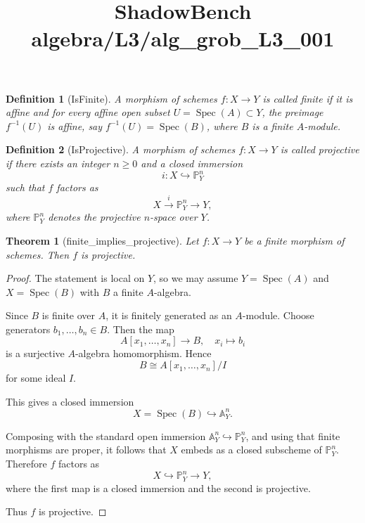 \documentclass{article}
\title{ShadowBench algebra/L3/alg\_grob\_L3\_001}
\newtheorem{theorem}{Theorem}
\newtheorem{definition}{Definition}
\begin{document}
\maketitle

\begin{definition}[IsFinite]
A morphism of schemes $f : X \to Y$ is called \emph{finite} if it is affine and for every affine open subset 
$U = \operatorname{Spec}(A) \subset Y$, the preimage $f^{-1}(U)$ is affine, say $f^{-1}(U) = \operatorname{Spec}(B)$, 
where $B$ is a finite $A$-module.
\end{definition}

\begin{definition}[IsProjective]
A morphism of schemes $f : X \to Y$ is called \emph{projective} if there exists an integer $n \ge 0$ and a closed immersion
\[
i : X \hookrightarrow \mathbb{P}^n_Y
\]
such that $f$ factors as
\[
X \xrightarrow{i} \mathbb{P}^n_Y \to Y,
\]
where $\mathbb{P}^n_Y$ denotes the projective $n$-space over $Y$.
\end{definition}

\begin{theorem}[finite_implies_projective]
Let $f : X \to Y$ be a finite morphism of schemes. Then $f$ is projective.
\end{theorem}
\begin{proof}
The statement is local on $Y$, so we may assume $Y = \operatorname{Spec}(A)$ 
and $X = \operatorname{Spec}(B)$ with $B$ a finite $A$-algebra.

Since $B$ is finite over $A$, it is finitely generated as an $A$-module. 
Choose generators $b_1, \dots, b_n \in B$. Then the map
\[
A[x_1, \dots, x_n] \to B, \quad x_i \mapsto b_i
\]
is a surjective $A$-algebra homomorphism. Hence
\[
B \cong A[x_1, \dots, x_n]/I
\]
for some ideal $I$.

This gives a closed immersion
\[
X = \operatorname{Spec}(B) \hookrightarrow \mathbb{A}^n_Y.
\]

Composing with the standard open immersion $\mathbb{A}^n_Y \hookrightarrow \mathbb{P}^n_Y$, 
and using that finite morphisms are proper, it follows that $X$ embeds as a closed 
subscheme of $\mathbb{P}^n_Y$. Therefore $f$ factors as
\[
X \hookrightarrow \mathbb{P}^n_Y \to Y,
\]
where the first map is a closed immersion and the second is projective.

Thus $f$ is projective.
\end{proof}
\end{document}
